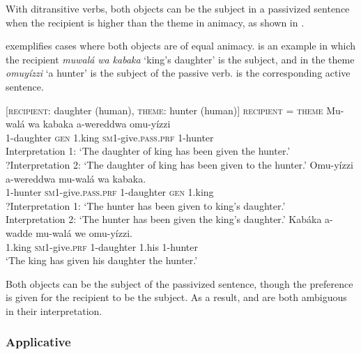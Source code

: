 \documentclass[output=paper,
            colorlinks, citecolor=brown
            ,draftmode
		  ]{langscibook}
\begin{document}
With ditransitive verbs, both objects can be the subject in a passivized sentence when the recipient is higher than the theme in animacy, as shown in . 

 exemplifies cases where both objects are of equal animacy.  is an example in which the recipient \textit{muwalá} \textit{wa kabaka} ‘king’s daughter’ is the subject, and in  the theme \textit{omuyízzi} ‘a hunter’ is the subject of the passive verb.  is the corresponding active sentence.


\ea%
    \label{ex:yoneda:20}
    [\textsc{recipient}: daughter (human), \textsc{theme}: hunter (human)]  \textsc{recipient} = \textsc{theme}
    \ea\label{ex:yoneda:20a} \gll Mu-walá   wa     kabaka   a-wereddwa           omu-yízzi  \\
         1-daughter \textsc{gen}  1.king    \textsc{sm1}-give.\textsc{pass.prf}  1-hunter\\
    \glt Interpretation 1:   ‘The daughter of king has been given the hunter.’\\
 ?Interpretation 2:  ‘The daughter of king has been given to the hunter.’
    \ex\label{ex:yoneda:20b} \gll Omu-yízzi   a-wereddwa           mu-walá     wa     kabaka.\\
    1-hunter      \textsc{sm1}-give.\textsc{pass.prf}  1-daughter    \textsc{gen}  1.king\\
    \glt ?Interpretation 1:  ‘The hunter has been given to king’s daughter.’  \\
    Interpretation 2:  ‘The hunter has been given the king’s daughter.’ 
    \ex\label{ex:yoneda:20c} \gll Kabáka   a-wadde         mu-walá     we     omu-yízzi.\\
    1.king    \textsc{sm1}-give.\textsc{prf}    1-daughter  1.his  1-hunter\\
    \glt ‘The king has given his daughter the hunter.’
    \z
\z
        
Both objects can be the subject of the passivized sentence, though the preference is given for the recipient to be the subject. As a result,  and  are both ambiguous in their interpretation.


\subsubsection{Applicative}\label{sec:yoneda:3.2.2}
\end{document}
